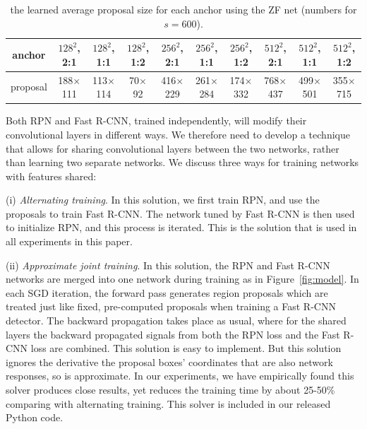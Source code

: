 \documentclass[10pt,journal,cspaper,compsoc]{IEEEtran}
\begin{document}
\setlength{\tabcolsep}{3pt}
\renewcommand{\arraystretch}{1.1}
\begin{table}[t]
\begin{center}
\caption{the learned average proposal size for each anchor using the ZF net (numbers for $s=600$).}
\vspace{-1em}
\small
\begin{tabular}{c||c|c|c||c|c|c||c|c|c}
  anchor & $128^2$, 2:1 & $128^2$, 1:1 & $128^2$, 1:2 & $256^2$, 2:1  & $256^2$, 1:1 & $256^2$, 1:2  & $512^2$, 2:1  & $512^2$, 1:1  & $512^2$, 1:2  \\
  \hline
  proposal & 188$\times$111 & 113$\times$114 & 70$\times$92 & 416$\times$229 & 261$\times$284 & 174$\times$332 & 768$\times$437 & 499$\times$501 & 355$\times$715  \\
\end{tabular}
\label{tab:anchorsZF}
\end{center}
\end{table}

Both RPN and Fast R-CNN, trained independently, will modify their convolutional layers in different ways.
We therefore need to develop a technique that allows for sharing convolutional layers between the two networks, rather than learning two separate networks. We discuss three ways for training networks with features shared:

(i) \emph{Alternating training}. In this solution, we first train RPN, and use the proposals to train Fast R-CNN. The network tuned by Fast R-CNN is then used to initialize RPN, and this process is iterated. This is the solution that is used in all experiments in this paper.

(ii) \emph{Approximate joint training}. In this solution, the RPN and Fast R-CNN networks are merged into one network during training as in Figure~\ref{fig:model}. In each SGD iteration, the forward pass generates region proposals which are treated just like fixed, pre-computed proposals when training a Fast R-CNN detector.
The backward propagation takes place as usual, where for the shared layers the backward propagated signals from both the RPN loss and the Fast R-CNN loss are combined. This solution is easy to implement. But this solution ignores the derivative \wrt the proposal boxes' coordinates that are also network responses, so is approximate.
In our experiments, we have empirically found this solver produces close results, yet reduces the training time by about 25-50\% comparing with alternating training. This solver is included in our released Python code.
\end{document}
